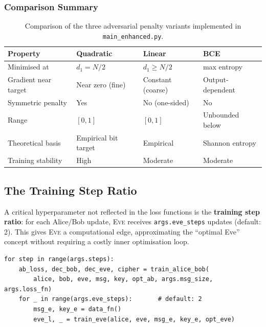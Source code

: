 \documentclass[12pt, a4paper]{article}
\newcommand{\eve}{\textsc{Eve}}
\newcommand{\code}[1]{\texttt{\color{CodeRed}#1}}
\begin{document}
\subsubsection*{Comparison Summary}

\begin{table}[H]
  \centering
  \caption{Comparison of the three adversarial penalty variants
           implemented in \code{main\_enhanced.py}.}
  \label{tab:loss_comparison}
  \renewcommand{\arraystretch}{1.4}
  \begin{tabularx}{\linewidth}{@{} l X X X @{}}
    \toprule
    \textbf{Property} & \textbf{Quadratic} & \textbf{Linear} &
    \textbf{BCE} \\
    \midrule
    Minimised at        & $d_1 = N/2$     & $d_1 \geq N/2$  & max entropy \\
    Gradient near target & Near zero (fine) & Constant (coarse) & Output-dependent \\
    Symmetric penalty   & Yes             & No (one-sided)  & No \\
    Range               & $[0,1]$         & $[0,1]$         & Unbounded below \\
    Theoretical basis   & Empirical bit target & Empirical  & Shannon entropy \\
    Training stability  & High            & Moderate        & Moderate \\
    \bottomrule
  \end{tabularx}
\end{table}

\subsection{The Training Step Ratio}
\label{subsec:step_ratio}

A critical hyperparameter not reflected in the loss functions is the
\textbf{training step ratio}: for each Alice/Bob update, \eve{} receives
\code{args.eve\_steps} updates (default: 2). This gives \eve{} a
computational edge, approximating the ``optimal Eve'' concept without
requiring a costly inner optimisation loop.

\begin{lstlisting}[caption={Configurable training step ratio in the main loop}]
for step in range(args.steps):
    ab_loss, dec_bob, dec_eve, cipher = train_alice_bob(
        alice, bob, eve, msg, key, opt_ab, args.msg_size, args.loss_fn)
    for _ in range(args.eve_steps):       # default: 2
        msg_e, key_e = data_fn()
        eve_l, _ = train_eve(alice, eve, msg_e, key_e, opt_eve)
\end{lstlisting}
\end{document}
